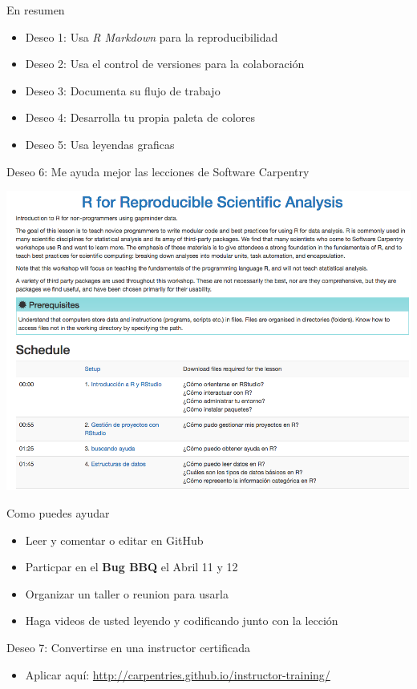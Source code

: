 \documentclass[ignorenonframetext,]{beamer}
\providecommand{\tightlist}{%
  \setlength{\itemsep}{0pt}\setlength{\parskip}{0pt}}
\begin{document}
\begin{frame}{En resumen}

\begin{itemize}
\tightlist
\item
  Deseo 1: Usa \emph{R Markdown} para la reproducibilidad
\item
  Deseo 2: Usa el control de versiones para la colaboración
\item
  Deseo 3: Documenta su flujo de trabajo
\item
  Deseo 4: Desarrolla tu propia paleta de colores
\item
  Deseo 5: Usa leyendas graficas
\end{itemize}

\end{frame}

\begin{frame}{Deseo 6: Me ayuda mejor las lecciones de Software
Carpentry}

\includegraphics{../figures/talk/R-gapminder-es.png}

\end{frame}

\begin{frame}{Como puedes ayudar}

\begin{itemize}[<+->]
\tightlist
\item
  Leer y comentar o editar en GitHub
\item
  Particpar en el \textbf{Bug BBQ} el Abril 11 y 12
\item
  Organizar un taller o reunion para usarla
\item
  Haga videos de usted leyendo y codificando junto con la lección
\end{itemize}

\end{frame}

\begin{frame}{Deseo 7: Convertirse en una instructor certificada}

\begin{itemize}[<+->]
\tightlist
\item
  Aplicar aquí: \url{http://carpentries.github.io/instructor-training/}
\end{itemize}

\end{frame}
\end{document}
